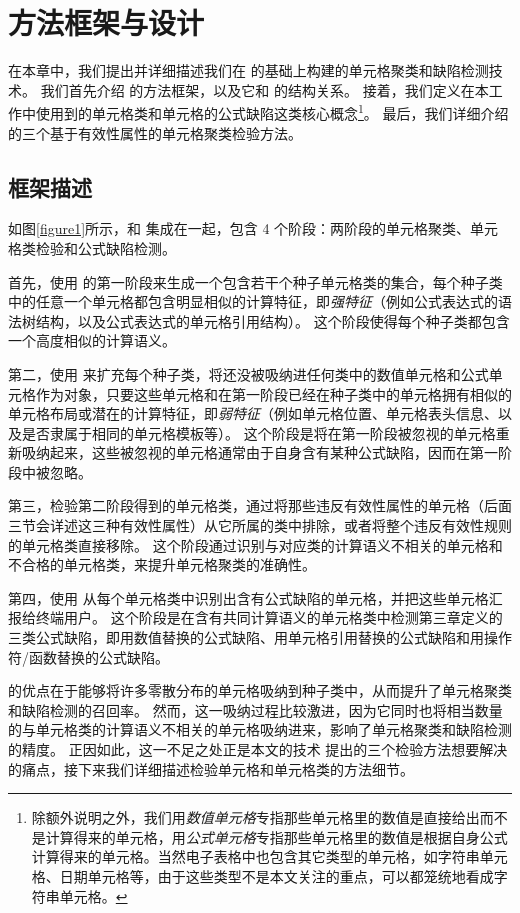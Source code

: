 \chapter{方法框架与设计}
在本章中，我们提出并详细描述我们在 \cu 的基础上构建的单元格聚类和缺陷检测技术\wa 。
我们首先介绍 \wa 的方法框架，以及它和 \cu 的结构关系。
接着，我们定义在本工作中使用到的单元格类和单元格的公式缺陷这类核心概念\footnote{除额外说明之外，我们用\textit{数值单元格}专指那些单元格里的数值是直接给出而不是计算得来的单元格，用\textit{公式单元格}专指那些单元格里的数值是根据自身公式计算得来的单元格。当然电子表格中也包含其它类型的单元格，如字符串单元格、日期单元格等，由于这些类型不是本文关注的重点，可以都笼统地看成字符串单元格。}。
最后，我们详细介绍 \wa 的三个基于有效性属性的单元格聚类检验方法。

\section{框架描述}
如图\ref{figure1}所示，\wa 和 \cu 集成在一起，包含 4 个阶段：两阶段的单元格聚类、单元格类检验和公式缺陷检测。

首先，\wa 使用 \cu 的第一阶段来生成一个包含若干个种子单元格类的集合，每个种子类中的任意一个单元格都包含明显相似的计算特征，即\textit{强特征}（例如公式表达式的语法树结构，以及公式表达式的单元格引用结构）。
这个阶段使得每个种子类都包含一个高度相似的计算语义。

第二，\wa 使用 \cu 来扩充每个种子类，将还没被吸纳进任何类中的数值单元格和公式单元格作为对象，只要这些单元格和在第一阶段已经在种子类中的单元格拥有相似的单元格布局或潜在的计算特征，即\textit{弱特征}（例如单元格位置、单元格表头信息、以及是否隶属于相同的单元格模板等）。
这个阶段是将在第一阶段被忽视的单元格重新吸纳起来，这些被忽视的单元格通常由于自身含有某种公式缺陷，因而在第一阶段中被忽略。

第三，\wa 检验第二阶段得到的单元格类，通过将那些违反有效性属性的单元格（后面三节会详述这三种有效性属性）从它所属的类中排除，或者将整个违反有效性规则的单元格类直接移除。
这个阶段通过识别与对应类的计算语义不相关的单元格和不合格的单元格类，来提升单元格聚类的准确性。

第四，\wa 使用 \cu 从每个单元格类中识别出含有公式缺陷的单元格，并把这些单元格汇报给终端用户。
这个阶段是在含有共同计算语义的单元格类中检测第三章定义的三类公式缺陷，即用数值替换的公式缺陷、用单元格引用替换的公式缺陷和用操作符/函数替换的公式缺陷。

\cu 的优点在于能够将许多零散分布的单元格吸纳到种子类中，从而提升了单元格聚类和缺陷检测的召回率\cite{cheung2016custodes}。
然而，这一吸纳过程比较激进，因为它同时也将相当数量的与单元格类的计算语义不相关的单元格吸纳进来，影响了单元格聚类和缺陷检测的精度。
正因如此，这一不足之处正是本文的技术 \wa 提出的三个检验方法想要解决的痛点，接下来我们详细描述检验单元格和单元格类的方法细节。


